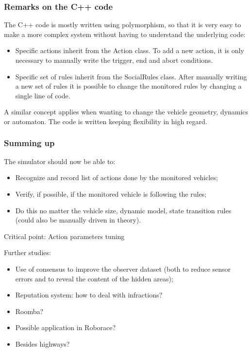 \documentclass{beamer}
\begin{document}
\begin{frame}
\frametitle{Remarks on the C++ code}
The C++ code is mostly written using polymorphism, so that it is
very easy to make a more complex system without having to understand the
underlying code:\\

\begin{itemize}
\item Specific actions inherit from the Action class. To add a new action,
	it is only necessary to manually write the trigger, end and abort 			    conditions.
\item Specific set of rules inherit from the SocialRules class. After   		    manually
	writing a new set of rules it is possible to change the monitored rules
	by changing a single line of code.
\end{itemize}

A similar concept applies when wanting to change the vehicle geometry, dynamics or automaton. The code is written keeping flexibility in high regard.


\end{frame}

\begin{frame}\label{Conclusions}
\frametitle{Summing up}
The simulator should now be able to:
\begin{itemize}
\item Recognize and record list of actions done by the monitored vehicles;
\item Verify, if possible, if the monitored vehicle is following the rules;
\item Do this no matter the vehicle size, dynamic model, state transition rules (could also be manually driven in theory).
\end{itemize}


\begin{alertblock}{Critical point:}
Action parameters tuning
\end{alertblock}

Further studies:
\begin{itemize}
\item Use of consensus to improve the observer dataset (both to reduce sensor errors and to reveal the content of the hidden areas);
\item Reputation system: how to deal with infractions?
\item Roomba?
\item Possible application in Roborace?
\item Besides highways? 
\end{itemize}


\end{frame}
\end{document}
